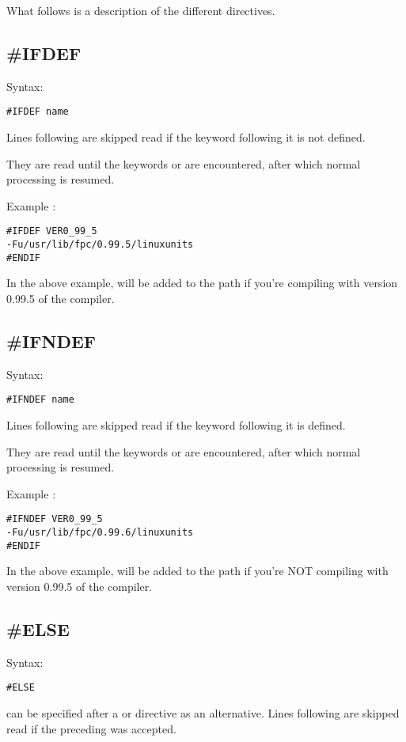 \documentclass{book}
\begin{document}
What follows is a description of the different directives.

\subsection{\#IFDEF}
Syntax:
\begin{verbatim}
#IFDEF name
\end{verbatim}
Lines following  are skipped read if the keyword 
following it is not defined.

They are read until the keywords  or  are
encountered, after which normal processing is resumed.

Example :
\begin{verbatim}
#IFDEF VER0_99_5
-Fu/usr/lib/fpc/0.99.5/linuxunits
#ENDIF
\end{verbatim}
In the above example,  will be added to
the path if you're compiling with version 0.99.5 of the compiler.

\subsection{\#IFNDEF}
Syntax:
\begin{verbatim}
#IFNDEF name
\end{verbatim}
Lines following  are skipped read if the keyword 
following it is defined.

They are read until the keywords  or  are
encountered, after which normal processing is resumed.

Example :
\begin{verbatim}
#IFNDEF VER0_99_5
-Fu/usr/lib/fpc/0.99.6/linuxunits
#ENDIF
\end{verbatim}
In the above example,  will be added to
the path if you're NOT compiling with version 0.99.5 of the compiler.

\subsection{\#ELSE}
Syntax:
\begin{verbatim}
#ELSE
\end{verbatim}
 can be specified after a  or 
directive as an alternative.
Lines following  are skipped read if the preceding 
 was accepted.
\end{document}
